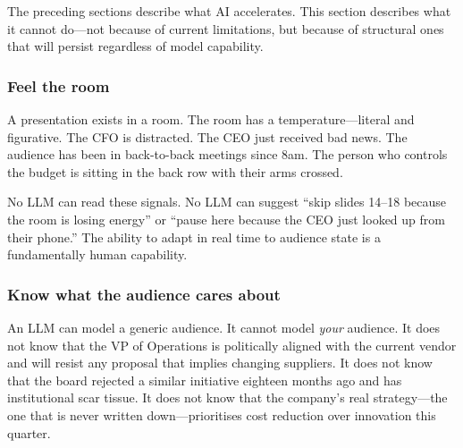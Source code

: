 The preceding sections describe what AI accelerates. This section describes what it cannot do---not because of current limitations, but because of structural ones that will persist regardless of model capability.

\subsubsection{Feel the room}

A presentation exists in a room. The room has a temperature---literal and figurative. The CFO is distracted. The CEO just received bad news. The audience has been in back-to-back meetings since 8am. The person who controls the budget is sitting in the back row with their arms crossed.

No LLM can read these signals. No LLM can suggest ``skip slides 14--18 because the room is losing energy'' or ``pause here because the CEO just looked up from their phone.'' The ability to adapt in real time to audience state is a fundamentally human capability.

\subsubsection{Know what the audience cares about}

An LLM can model a generic audience. It cannot model \emph{your} audience. It does not know that the VP of Operations is politically aligned with the current vendor and will resist any proposal that implies changing suppliers. It does not know that the board rejected a similar initiative eighteen months ago and has institutional scar tissue. It does not know that the company's real strategy---the one that is never written down---prioritises cost reduction over innovation this quarter.

